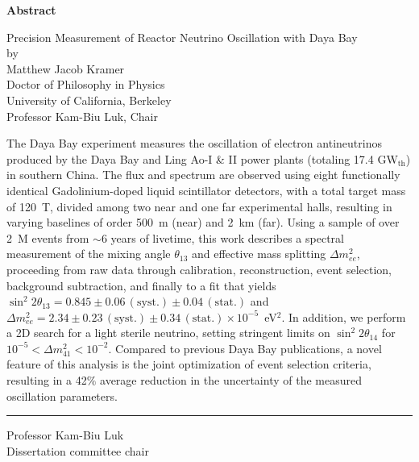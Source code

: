 \MyDoubleSpacing

\begin{center}
  \mylarge
  \textbf{Abstract}

  \vspace{1.5\baselineskip}
  Precision Measurement of Reactor Neutrino Oscillation with Daya Bay\\
  \vspace{\baselineskip} by\\
  \vspace{\baselineskip} Matthew Jacob Kramer\\
  Doctor of Philosophy in Physics\\
  University of California, Berkeley\\
  Professor Kam-Biu Luk, Chair
  \vspace{\baselineskip}
\end{center}

\normalsize
\MyDoubleSpacing
\noindent
%
The Daya Bay experiment measures the oscillation of electron antineutrinos
produced by the Daya Bay and Ling Ao-I \& II power plants (totaling 17.4
GW$_\mathrm{th}$) in southern China. The flux and spectrum are observed using
eight functionally identical Gadolinium-doped liquid scintillator detectors,
with a total target mass of 120~T, divided among two near and one far
experimental halls, resulting in varying baselines of order 500~m (near) and
2~km (far). Using a sample of over 2~M events from $\sim$6 years of livetime,
this work describes a spectral measurement of the mixing angle $\theta_{13}$ and
effective mass splitting $\Delta m^2_{ee}$, proceeding from raw data through
calibration, reconstruction, event selection, background subtraction, and
finally to a fit that yields $\sin^2 2\theta_{13} = 0.845 \pm
0.06\,\mathrm{(syst.)} \pm 0.04\,\mathrm{(stat.)}$ and $\Delta m^2_{ee} = 2.34
\pm 0.23\,\mathrm{(syst.)} \pm 0.34\,\mathrm{(stat.)} \times 10^{-5}$~eV$^2$. In
addition, we perform a 2D search for a light sterile neutrino, setting stringent
limits on $\sin^2 2\theta_{14}$ for $10^{-5} < \Delta m^2_{41} < 10^{-2}$.
Compared to previous Daya Bay publications, a novel feature of this analysis is
the joint optimization of event selection criteria, resulting in a 42$\%$
average reduction in the uncertainty of the measured oscillation parameters.

\SingleSpacing
\vspace{2.5\baselineskip}
\hfill
\begin{minipage}{0.4\textwidth}
  \hrule\vspace{0.4\baselineskip}
  Professor Kam-Biu Luk\\
  Dissertation committee chair
\end{minipage}

\clearpage